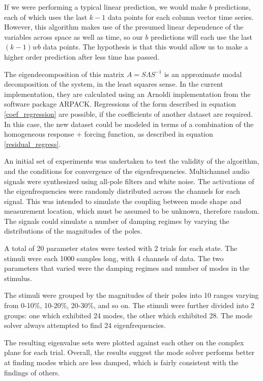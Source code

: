 \documentclass[a4paper,10pt]{report}
\numberwithin{equation}{section}
\begin{document}
If we were performing a typical linear prediction, we would make $b$ predictions, each of which uses the last $k-1$ data points for each column vector time series. However, this algorithm makes use of the presumed linear dependence of the variables across space as well as time, so our $b$ predictions will each use the last $(k-1) wb$ data points. The hypothesis is that this would allow us to make a higher order prediction after less time has passed. 

The eigendecomposition of this matrix $A = S\Lambda S^{-1}$ is an approximate modal decomposition of the system, in the least squares sense. In the current implementation, they are calculated using an Arnoldi implementation from the software package ARPACK. Regressions of the form described in equation \eqref{coef_regression} are possible, if the coefficients of another dataset are required. In this case, the new dataset could be modeled in terms of a combination of the homogeneous response + forcing function, as described in equation \eqref{residual_regress}. 

An initial set of experiments was undertaken to test the validity of the algorithm, and the conditions for convergence of the eigenfrequencies. Multichannel audio signals were synthesized using all-pole filters and white noise. The activations of the eigenfrequencies were randomly distributed across the channels for each signal. This was intended to simulate the coupling between mode shape and measurement location, which must be assumed to be unknown, therefore random. The signals could simulate a number of damping regimes by varying the distributions of the magnitudes of the poles. 

A total of 20 parameter states were tested with 2 trials for each state. The stimuli were each 1000 samples long, with 4 channels of data. The two parameters that varied were the damping regimes and number of modes in the stimulus. 

The stimuli were grouped by the magnitudes of their poles into 10 ranges varying from 0-10\%, 10-20\%, 20-30\%, and so on. The stimuli were further divided into 2 groups: one which exhibited 24 modes, the other which exhibited 28. The mode solver always attempted to find 24 eigenfrequencies.

The resulting eigenvalue sets were plotted against each other on the complex plane for each trial. Overall, the results suggest the mode solver performs better at finding modes which are less damped, which is fairly consistent with the findings of others. \cite{Chen2012} \cite{Feeny1998} \cite{Kerschen2002} \cite{Han2003} 
\end{document}
